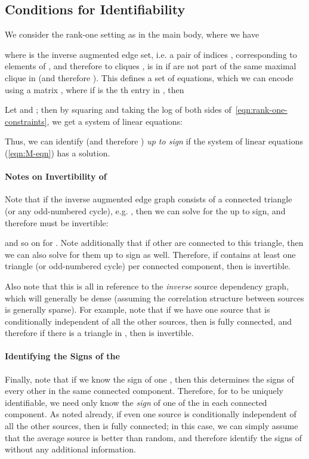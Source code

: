\documentclass[letterpaper]{article}
\begin{document}
\begin{appendix}
\subsection{Conditions for Identifiability}
\label{appendix:identifiability}
We consider the rank-one setting as in the main body, where we have

where  is the inverse augmented edge set, i.e. a pair of indices , corresponding to elements of , and therefore to cliques , is in  if  are not part of the same maximal clique in  (and therefore ).
This defines a set of  equations, which we can encode using a matrix , where if  is the th entry in , then

Let  and ; then by squaring and taking the log of both sides of~\ref{eqn:rank-one-constraints}, we get a system of linear equations:

Thus, we can identify  (and therefore ) \textit{up to sign} if the system of linear equations (\ref{eqn:M-eqn}) has a solution.

\paragraph*{Notes on Invertibility of }
Note that if the inverse augmented edge graph consists of a connected triangle (or any odd-numbered cycle), e.g. , then we can solve for the  up to sign, and therefore  must be invertible:

and so on for .
Note additionally that if other  are connected to this triangle, then we can also solve for them up to sign as well.
Therefore, if  contains at least one triangle (or odd-numbered cycle) per connected component, then  is invertible.

Also note that this is all in reference to the \textit{inverse} source dependency graph, which will generally be dense (assuming the correlation structure between sources is generally sparse).
For example, note that if we have one source  that is conditionally independent of all the other sources, then  is fully connected, and therefore if there is a triangle in , then  is invertible.

\paragraph*{Identifying the Signs of the }
Finally, note that if we know the sign of one , then this determines the signs of every other  in the same connected component.
Therefore, for  to be uniquely identifiable, we need only know the \textit{sign} of one of the  in each connected component.
As noted already, if even one source  is conditionally independent of all the other sources, then  is fully connected; in this case, we can simply assume that the average source is better than random, and therefore identify the signs of  without any additional information.


\end{appendix}
\end{document}
